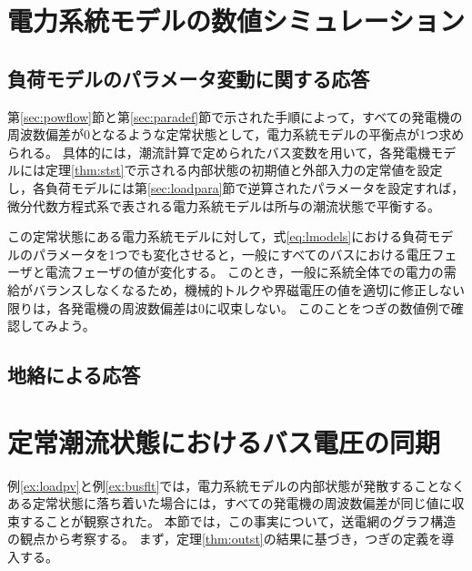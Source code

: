 \documentclass[tombow,dvipdfmx]{corona-a5}
\begin{document}
\section{電力系統モデルの数値シミュレーション}

\subsection{負荷モデルのパラメータ変動に関する応答}

第\ref{sec:powflow}節と第\ref{sec:paradef}節で示された手順によって，すべての発電機の周波数偏差が0となるような定常状態として，電力系統モデルの平衡点が1つ求められる。
具体的には，潮流計算で定められたバス変数を用いて，各発電機モデルには定理\ref{thm:stst}で示される内部状態の初期値と外部入力の定常値を設定し，各負荷モデルには第\ref{sec:loadpara}節で逆算されたパラメータを設定すれば，微分代数方程式系で表される電力系統モデルは所与の潮流状態で平衡する。

この定常状態にある電力系統モデルに対して，式\ref{eq:lmodels}における負荷モデルのパラメータを1つでも変化させると，一般にすべてのバスにおける電圧フェーザと電流フェーザの値が変化する。
このとき，一般に系統全体での電力の需給がバランスしなくなるため，機械的トルクや界磁電圧の値を適切に修正しない限りは，各発電機の周波数偏差は0に収束しない。
このことをつぎの数値例で確認してみよう。

\begin{例}[負荷モデルのパラメータを変化させたときの電力系統モデルの時間応答]\label{ex:loadpv}
\end{例}


\subsection{地絡による応答}

\begin{例}[バス地絡が発生したときの電力系統モデルの時間応答]\label{ex:busflt}
\end{例}


\section{定常潮流状態におけるバス電圧の同期}\label{sec:phsync}

例\ref{ex:loadpv}と例\ref{ex:busflt}では，電力系統モデルの内部状態が発散することなくある定常状態に落ち着いた場合には，すべての発電機の周波数偏差が同じ値に収束することが観察された。
本節では，この事実について，送電網のグラフ構造の観点から考察する。
まず，定理\ref{thm:outst}の結果に基づき，つぎの定義を導入する。
\end{document}
